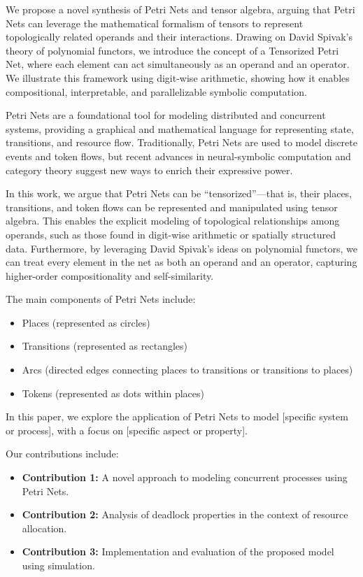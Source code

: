 
We propose a novel synthesis of Petri Nets and tensor algebra, arguing that Petri Nets can leverage the mathematical formalism of tensors to represent topologically related operands and their interactions. Drawing on David Spivak’s theory of polynomial functors, we introduce the concept of a Tensorized Petri Net, where each element can act simultaneously as an operand and an operator. We illustrate this framework using digit-wise arithmetic, showing how it enables compositional, interpretable, and parallelizable symbolic computation.

Petri Nets are a foundational tool for modeling distributed and concurrent systems, providing a graphical and mathematical language for representing state, transitions, and resource flow. Traditionally, Petri Nets are used to model discrete events and token flows, but recent advances in neural-symbolic computation and category theory suggest new ways to enrich their expressive power.

In this work, we argue that Petri Nets can be “tensorized”—that is, their places, transitions, and token flows can be represented and manipulated using tensor algebra. This enables the explicit modeling of topological relationships among operands, such as those found in digit-wise arithmetic or spatially structured data. Furthermore, by leveraging David Spivak’s ideas on polynomial functors, we can treat every element in the net as both an operand and an operator, capturing higher-order compositionality and self-similarity.

The main components of Petri Nets include:
\begin{itemize}
    \item Places (represented as circles)
    \item Transitions (represented as rectangles)
    \item Arcs (directed edges connecting places to transitions or transitions to places)
    \item Tokens (represented as dots within places)
\end{itemize}

In this paper, we explore the application of Petri Nets to model [specific system or process], with a focus on [specific aspect or property]. %

Our contributions include:
\begin{itemize}[leftmargin=*,align=left]
    \item \textbf{Contribution 1:} A novel approach to modeling concurrent processes using Petri Nets.
    \item \textbf{Contribution 2:} Analysis of deadlock properties in the context of resource allocation.
    \item \textbf{Contribution 3:} Implementation and evaluation of the proposed model using simulation.
\end{itemize}

